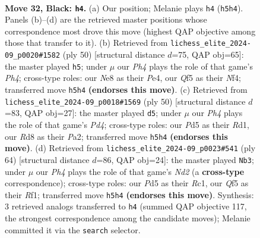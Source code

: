 \documentclass[11pt]{article}
\begin{document}
\clearpage

\begin{figure}[p]\centering
\begin{subfigure}{0.46\textwidth}\centering
\resizebox{\linewidth}{!}{%
\newchessgame
\chessboard[
  setfen={1r1rnk2/p1p5/5p2/2Pp1q1p/5P2/QP2P3/3BK1RP/5BR1 b - - 1 32},
  showmover=false,
  pgfstyle=straightmove, color=movearrow, markmove={h5-h4}
]}
\caption{}
\end{subfigure}\hfill
\begin{subfigure}{0.46\textwidth}\centering
\resizebox{\linewidth}{!}{%
\newchessgame
\chessboard[
  setfen={2r1r1k1/3q2bp/3pp1p1/8/2PpPNQP/3P4/6P1/R4R1K w - - 1 26},
  showmover=false,
  pgfstyle=straightmove, color=movearrow, markmove={h4-h5}
]}
\caption{}
\end{subfigure}
\\[4pt]
\begin{subfigure}{0.46\textwidth}\centering
\resizebox{\linewidth}{!}{%
\newchessgame
\chessboard[
  setfen={3r1r1k/p1b3qp/1pp1pp2/8/2PP4/4NQP1/PP5P/1K1RR3 w - - 3 26},
  showmover=false,
  pgfstyle=straightmove, color=movearrow, markmove={d4-d5}
]}
\caption{}
\end{subfigure}\hfill
\begin{subfigure}{0.46\textwidth}\centering
\resizebox{\linewidth}{!}{%
\newchessgame
\chessboard[
  setfen={2r2rk1/p5b1/6q1/1PpPp2p/P3Ppp1/8/3NQ1PP/2R2R1K w - - 2 33},
  showmover=false,
  pgfstyle=straightmove, color=movearrow, markmove={d2-b3}
]}
\caption{}
\end{subfigure}
\caption{\textbf{Move 32, Black: \texttt{h4}.} (a) Our position; Melanie plays \texttt{h4} (\texttt{h5h4}). Panels (b)--(d) are the retrieved master positions whose correspondence most drove this move (highest QAP objective among those that transfer to it). (b) Retrieved from \texttt{lichess\_elite\_2024-09\_p0020\#1582} (ply 50) [structural distance $d$=75, QAP obj=65]: the master played \texttt{h5}; under $\mu$ our \emph{Ph4} plays the role of that game's \emph{Ph4}; cross-type roles: our \emph{N}e8 as their \emph{P}e4, our \emph{Q}f5 as their \emph{N}f4; transferred move \texttt{h5h4} \textbf{(endorses this move)}. (c) Retrieved from \texttt{lichess\_elite\_2024-09\_p0018\#1569} (ply 50) [structural distance $d$=83, QAP obj=27]: the master played \texttt{d5}; under $\mu$ our \emph{Ph4} plays the role of that game's \emph{Pd4}; cross-type roles: our \emph{P}d5 as their \emph{R}d1, our \emph{R}d8 as their \emph{P}a2; transferred move \texttt{h5h4} \textbf{(endorses this move)}. (d) Retrieved from \texttt{lichess\_elite\_2024-09\_p0023\#541} (ply 64) [structural distance $d$=86, QAP obj=24]: the master played \texttt{Nb3}; under $\mu$ our \emph{Ph4} plays the role of that game's \emph{Nd2} (a \textbf{cross-type} correspondence); cross-type roles: our \emph{P}d5 as their \emph{R}c1, our \emph{Q}f5 as their \emph{R}f1; transferred move \texttt{h5h4} \textbf{(endorses this move)}. Synthesis: 3 retrieved analogs transferred to \texttt{h4} (summed QAP objective 117, the strongest correspondence among the candidate moves); Melanie committed it via the \texttt{search} selector.}
\label{fig:thought-m63}
\end{figure}
\end{document}

